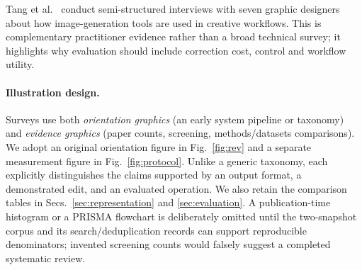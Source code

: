 Tang et al.~\citep{tang2024designinterviews} conduct semi-structured interviews with seven graphic designers about how image-generation tools are used in creative workflows. This is complementary practitioner evidence rather than a broad technical survey; it highlights why evaluation should include correction cost, control and workflow utility.



\paragraph{Illustration design.}
Surveys use both \emph{orientation graphics} (an early system pipeline or taxonomy) and \emph{evidence graphics} (paper counts, screening, methods/datasets comparisons). We adopt an original orientation figure in Fig.~\ref{fig:rev} and a separate measurement figure in Fig.~\ref{fig:protocol}. Unlike a generic taxonomy, each explicitly distinguishes the claims supported by an output format, a demonstrated edit, and an evaluated operation. We also retain the comparison tables in Secs.~\ref{sec:representation} and \ref{sec:evaluation}. A publication-time histogram or a PRISMA flowchart is deliberately omitted until the two-snapshot corpus and its search/deduplication records can support reproducible denominators; invented screening counts would falsely suggest a completed systematic review.
